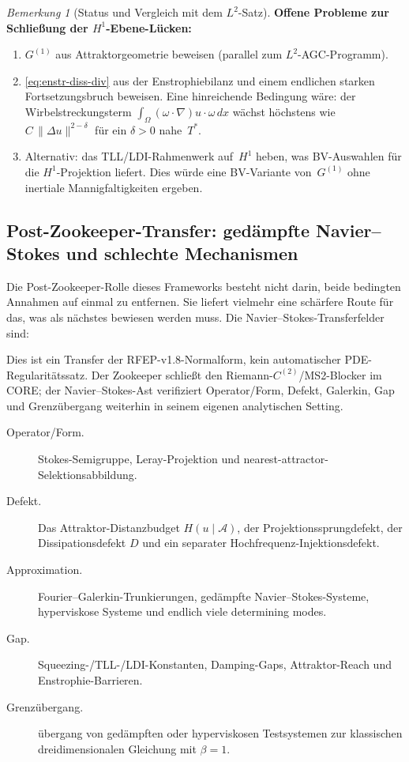 \documentclass[12pt,a4paper]{article}
\theoremstyle{definition}
\theoremstyle{plain}
\theoremstyle{remark}
\newtheorem{remark}[definition]{Bemerkung}
\begin{document}
\begin{remark}[Status und Vergleich mit dem $L^2$-Satz]
\medskip\noindent
\textbf{Offene Probleme zur Schließung der $H^1$-Ebene-Lücken:}
\begin{enumerate}
  \item $G^{(1)}$ aus Attraktorgeometrie beweisen (parallel zum
    $L^2$-AGC-Programm).
  \item \eqref{eq:enstr-diss-div} aus der Enstrophiebilanz
    und einem endlichen starken Fortsetzungsbruch beweisen. Eine hinreichende Bedingung wäre: der Wirbelstreckungsterm $\int_\Omega(\omega\cdot\nabla)u\cdot\omega\,dx$
    wächst höchstens wie $C\,\|\Delta u\|^{2-\delta}$ für ein
    $\delta > 0$ nahe~$T^*$.
  \item Alternativ: das TLL/LDI-Rahmenwerk auf~$H^1$ heben,
    was BV-Auswahlen für die $H^1$-Projektion liefert. Dies würde
    eine BV-Variante von~$G^{(1)}$ ohne inertiale Mannigfaltigkeiten ergeben.
\end{enumerate}
\end{remark}


\subsection{Post-Zookeeper-Transfer: gedämpfte Navier--Stokes und schlechte Mechanismen}
\label{subsec:zookeeper-ns-transfer}

Die Post-Zookeeper-Rolle dieses Frameworks besteht nicht darin, beide
bedingten Annahmen auf einmal zu entfernen.  Sie liefert vielmehr eine
schärfere Route für das, was als nächstes bewiesen werden muss.  Die
Navier--Stokes-Transferfelder sind:

Dies ist ein Transfer der RFEP-v1.8-Normalform, kein automatischer
PDE-Regularitätssatz.  Der Zookeeper schließt den
Riemann-$C^{(2)}$/MS2-Blocker im CORE; der Navier--Stokes-Ast
verifiziert Operator/Form, Defekt, Galerkin, Gap und Grenzübergang
weiterhin in seinem eigenen analytischen Setting.
\begin{description}
  \item[Operator/Form.] Stokes-Semigruppe, Leray-Projektion und
  nearest-attractor-Selektionsabbildung.
  \item[Defekt.] Das Attraktor-Distanzbudget $H(u\mid\mathcal{A})$, der
  Projektionssprungdefekt, der Dissipationsdefekt $D$ und ein separater
  Hochfrequenz-Injektionsdefekt.
  \item[Approximation.] Fourier--Galerkin-Trunkierungen, gedämpfte
  Navier--Stokes-Systeme, hyperviskose Systeme und endlich viele
  determining modes.
  \item[Gap.] Squeezing-/TLL-/LDI-Konstanten, Damping-Gaps,
  Attraktor-Reach und Enstrophie-Barrieren.
  \item[Grenzübergang.] übergang von gedämpften oder hyperviskosen
  Testsystemen zur klassischen dreidimensionalen Gleichung mit
  $\beta=1$.
\end{description}
\end{document}
